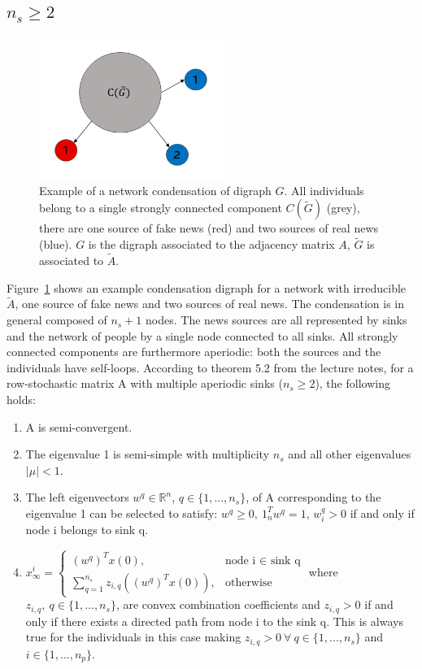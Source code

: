 \subsection{$n_s \geq 2$}
\begin{figure}[!t]
	\centering
	\includegraphics[width = 6cm]{Figures/condensation_digraph.png}
	\caption{Example of a network condensation of digraph $G$. All individuals belong to a single strongly connected component $C(\tilde{G})$ (grey), there are one source of fake news (red) and two sources of real news (blue). $G$ is the digraph associated to the adjacency matrix $A$, $\tilde{G}$ is associated to $\tilde{A}$.}
	\label{pics:condensation_digraph_example}
\end{figure}
Figure~\ref{pics:condensation_digraph_example} shows an example condensation digraph for a network with irreducible $\tilde{A}$, one source of fake news and two sources of real news. The condensation is in general composed of $n_s+1$ nodes.  The news sources are all represented by sinks and the network of people by a single node connected to all sinks. \newline
All strongly connected components are furthermore aperiodic: both the sources and the individuals have self-loops.
According to theorem 5.2 from the lecture notes, for a row-stochastic matrix A with multiple aperiodic sinks ($n_s \geq 2$), the following holds:
\begin{enumerate}
	\item
	A is semi-convergent.
	\item
	The eigenvalue 1 is semi-simple with multiplicity $n_s$ and all other eigenvalues $|\mu|<1$.
	\item
	The left eigenvectors $w^q \in \mathbb{R}^n$, $q\in \{1,...,n_s\}$, of A corresponding to the eigenvalue 1 can be selected to satisfy: $w^q\geq0,\ 1_n^Tw^q=1$, $w^q_i>0$ if and only if node i belongs to sink q.
	\item
	$
	x_{\infty}^i = 
	\begin{cases}
	(w^q)^Tx(0),& \text{node i $\in$ sink q}\\
	\sum_{q=1}^{n_s} z_{i,q}((w^q)^Tx(0)), & \text{otherwise}
	\end{cases}
	$
	where $z_{i,q},\ q\in\{1,...,n_s\}$, are convex combination coefficients and $z_{i,q} > 0$ if and only if there exists a directed path from node i to the sink q. This is always true for the individuals in this case making $z_{i,q} > 0\ \forall\ q \in \{1,...,n_s\}$ and $i \in \{1,...,n_p\}$.
\end{enumerate}
